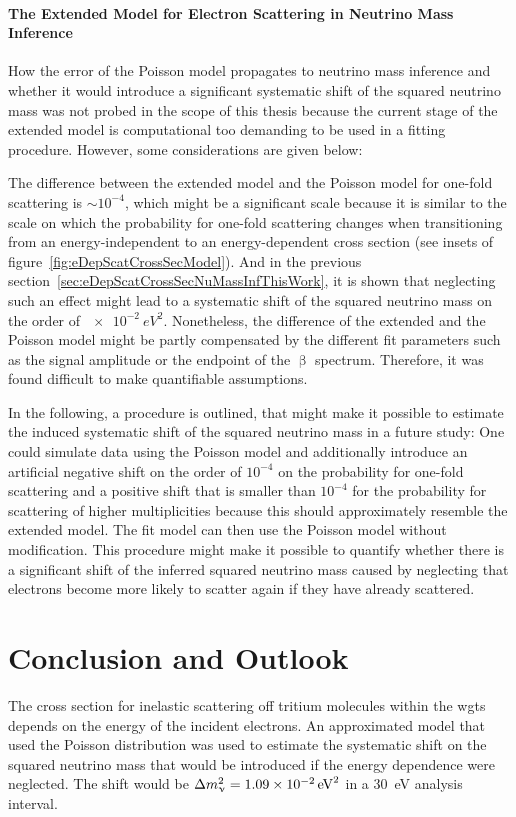 \paragraph{The Extended Model for Electron Scattering in Neutrino Mass Inference}
How the error of the Poisson model propagates to neutrino mass inference and whether it would introduce a significant systematic shift of the squared neutrino mass was not probed in the scope of this thesis because the current stage of the extended model is computational too demanding to be used in a fitting procedure. However, some considerations are given below:

The difference between the extended model and the Poisson model for one-fold scattering is $\sim10^{-4}$, which might be a significant scale because it is similar to the scale on which the probability for one-fold scattering changes when transitioning from an energy-independent to an energy-dependent cross section (see insets of figure~\ref{fig:eDepScatCrossSecModel}). And in the previous section~\ref{sec:eDepScatCrossSecNuMassInfThisWork}, it is shown that neglecting such an effect might lead to a systematic shift of the squared neutrino mass on the order of $\SI{e-2}{eV^2}$. Nonetheless, the difference of the extended and the Poisson model might be partly compensated by the different fit parameters such as the signal amplitude or the endpoint of the $\upbeta$ spectrum. Therefore, it was found difficult to make quantifiable assumptions.

In the following, a procedure is outlined, that might make it possible to estimate the induced systematic shift of the squared neutrino mass in a future study: One could simulate data using the Poisson model and additionally introduce an artificial negative shift on the order of $10^{-4}$ on the probability for one-fold scattering and a positive shift that is smaller than $10^{-4}$ for the probability for scattering of higher multiplicities because this should approximately resemble the extended model. The fit model can then use the Poisson model without modification. This procedure might make it possible to quantify whether there is a significant shift of the inferred squared neutrino mass caused by neglecting that electrons become more likely to scatter again if they have already scattered.

\section{Conclusion and Outlook}
\label{sec:eDepScatCrossSecConclusion}
The cross section for inelastic scattering off tritium molecules within the \gls{wgts} depends on the energy of the incident electrons. An approximated model that used the Poisson distribution was used to estimate the systematic shift on the squared neutrino mass that would be introduced if the energy dependence were neglected. The shift would be $\Delta m_\upnu^2 = \SI{1.09e-2}{eV^2}$ in a \SI{30}{eV} analysis interval.

